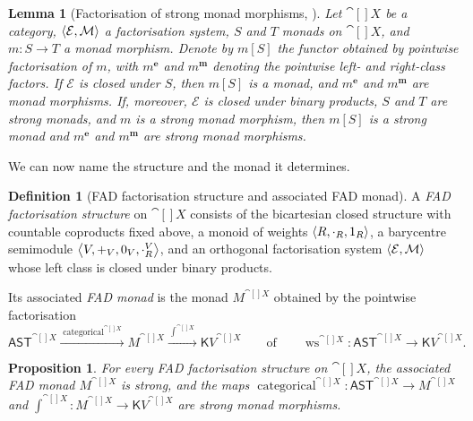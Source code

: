 \documentclass[11pt,a4paper]{article}
\newtheorem{proposition}[theorem]{Proposition}
\newtheorem{lemma}[theorem]{Lemma}
\theoremstyle{definition}
\newtheorem{definition}[theorem]{Definition}
\theoremstyle{remark}
\providecommand{\AST}{\mathsf{AST}}
\providecommand{\categ}{\operatorname{categorical}}
\providecommand{\iwrt}{\int}
\providecommand{\ws}{\operatorname{ws}}
\providecommand{\cont}{\mathsf{K}}
\providecommand{\runit}{1_R}
\providecommand{\rcdot}{\cdot_R}
\providecommand{\vplus}{+_V}
\providecommand{\vzero}{0_V}
\providecommand{\vrdot}{\cdot_R^V}
\begin{document}
\begin{lemma}[Factorisation of strong monad morphisms, {\cite[Theorem~2.5]{kammarFactorisationSystemsLogical2018}}]\label{lem:factorisation-of-strong-monad-morphisms}
	Let \( \cat[]{X} \) be a category, \( \left\langle \mathcal{E},\mathcal{M}\right\rangle \) a
	factorisation system, \( S \) and \( T \) monads on \( \cat[]{X} \), and
	\( m:S\to T \) a monad morphism. Denote by \( m[S] \) the functor obtained
	by pointwise factorisation of \(m\), with \( m^{\mathbf{e}} \) and
	\( m^{\mathbf{m}} \) denoting the pointwise left- and right-class factors.
	If \( \mathcal{E} \) is closed under \(S\), then \(m[S]\) is a monad, and
	\( m^{\mathbf{e}} \) and \( m^{\mathbf{m}} \) are monad morphisms. If,
	moreover, \( \mathcal{E} \) is closed under binary products, \(S\) and \(T\)
	are strong monads, and \(m\) is a strong monad morphism, then \(m[S]\) is a
	strong monad and \( m^{\mathbf{e}} \) and \( m^{\mathbf{m}} \) are strong
	monad morphisms.
\end{lemma}

We can now name the structure and the monad it determines.

\begin{definition}[FAD factorisation structure and associated FAD monad]
	A \emph{FAD factorisation structure} on \( \cat[]{X} \) consists of the
	bicartesian closed structure with countable coproducts fixed above, a monoid
	of weights \( \tuple{R,\rcdot,\runit} \), a barycentre semimodule
	\( \tuple{V,\vplus,\vzero,\vrdot} \), and an orthogonal factorisation system
	\( \left\langle \mathcal{E},\mathcal{M}\right\rangle \) whose left class is closed under binary
	products.

	Its associated \emph{FAD monad} is the
	monad \(M^{\cat[]{X}}\) obtained by the pointwise factorisation
  	\[
	\AST^{\cat[]{X}}
	\xrightarrow{\;\categ^{\cat[]{X}}\;}
	M^{\cat[]{X}}
	\xrightarrow{\;\iwrt^{\cat[]{X}}\;}
	\cont{V}^{\cat[]{X}}
	\qquad\text{of}\qquad
	\ws^{\cat[]{X}}:
	\AST^{\cat[]{X}}
	\to
	\cont{V}^{\cat[]{X}} .
	\]

\end{definition}

\begin{proposition}
	For every FAD factorisation structure on \( \cat[]{X} \), the associated
	FAD monad \(M^{\cat[]{X}}\) is strong, and the maps
	\(
	\categ^{\cat[]{X}}:
	\AST^{\cat[]{X}}\to M^{\cat[]{X}}\) and
	\(\iwrt^{\cat[]{X}}:
	M^{\cat[]{X}}\to \cont{V}^{\cat[]{X}}
	\)
	are strong monad morphisms.
\end{proposition}
\end{document}
